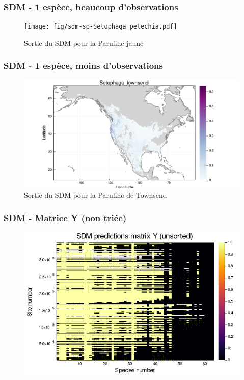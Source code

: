 \documentclass[10pt]{beamer}
\begin{document}

\begin{frame}
  \frametitle{SDM - 1 espèce, beaucoup d'observations}
  \begin{figure}
    \centering
    \texttt{[image: fig/sdm-sp-Setophaga\_petechia.pdf]}
    \caption{Sortie du SDM pour la Paruline jaune}
  \end{figure}
\end{frame}

\begin{frame}
  \frametitle{SDM - 1 espèce, moins d'observations}
  \begin{figure}
    \centering
    \includegraphics[scale=0.4]{fig/sdm-sp-Setophaga_townsendi.pdf}
    \caption{Sortie du SDM pour la Paruline de Townsend}
  \end{figure}
\end{frame}

\begin{frame}
  \frametitle{SDM - Matrice Y (non triée)}
  \begin{figure}
    \centering
    \includegraphics[scale=0.4]{fig/sdm-Y-unsorted.png}
  \end{figure}
\end{frame}
\end{document}

